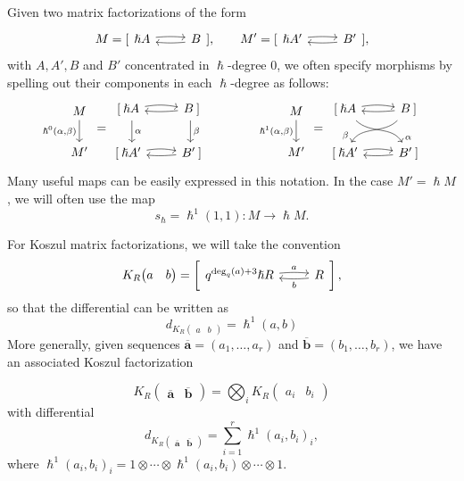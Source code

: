 \documentclass{article}
\newcommand{\mfshort}[4]{%
  \begin{tikzcd}[ampersand replacement=\&]
    {#1} \arrow[r, "#3", bend left=5,start anchor=east, end anchor=west, shift left=2pt]  \& 
    {#2} \arrow[l,"#4", bend left=5, start anchor=west, end anchor=east, shift left=2pt]
  \end{tikzcd}%
}
\newcommand{\kmf}[2]{
	K_{#1}{\begin{pmatrix}
			#2
		\end{pmatrix}
	}	
}
\newcommand{\skmf}[2]{
	K_{#1}{\left(\begin{smallmatrix}
			#2
		\end{smallmatrix}\right)
	}	
}
\theoremstyle{plain} %
\theoremstyle{definition} %
\theoremstyle{remark} %
\begin{document}
Given two matrix factorizations of the form
$$
M=[\mfshort{\hslash  A}{ B}{}{}]
,\qquad 
M'=[\mfshort{\hslash A'}{B'}{}{}]
,
$$
with $A,A',B$ and $B'$ concentrated in $\hslash$-degree 0, we often specify morphisms by spelling out their components in each $\hslash$-degree as follows:
\[
\begin{tikzcd}
    M 
    \arrow[d, "{\hslash^0(\alpha,\beta)}",swap] 
    \\ 
    M'
\end{tikzcd}
=
\begin{tikzcd}
    {} [ \: \hslash A \arrow[d, "\alpha", shift left=3pt]
    \arrow[r, out=5, in=175, bend left=10]  
    &  
     B\:]
    \arrow[d, "\beta", shift right=1pt] 
    \arrow[l, out=185, in=-5, swap]
    \\
   	{}  [\: \hslash A' 
   	\arrow[r, out=5, in=175, bend left=10]
   	& 
    B' \:]
    \arrow[l, out=185, in=-5, swap]
\end{tikzcd}
\qquad\qquad 
\begin{tikzcd}
    M 
    \arrow[d, "{\hslash^1(\alpha,\beta)}",swap] 
    \\ 
    M'
\end{tikzcd}
=
\begin{tikzcd}
    {}  [\:\hslash A \arrow[dr, "\alpha"{pos=1}, out=-45, in=120]\arrow[r, out=5, in=175, bend left=10]  &   B\:]\arrow[dl, "\beta"{pos=1}, out=-135, in=60,swap] \arrow[l, out=185, in=-5, swap]\\
     {} [\:\hslash A' \arrow[r, out=5, in=175, bend left=10]& 
     B' \arrow[l, out=185, in=-5, swap]\:]
\end{tikzcd}
\]
Many useful maps can be easily expressed in this notation. In the case $M'=\hslash M$, we will often use the map
$$
s_\hslash =\hslash^1(1,1):M\to \hslash M
.
$$

For Koszul matrix factorizations, we will take the convention
$$
	\kmf{R}{a & b }
	=
	\left[\mfshort{q^{\deg_q(a)+3} \hslash  R}{R}{a}{b}\right]
	,
$$
so that the differential can be written as
$$
d_{\skmf{R}{a & b }}=\hslash^1 (a,b)
$$
More generally, given sequences $\mathbf{\overline a}=(a_1,\dots,a_r)$ and  $ \mathbf{\overline b}=(b_1,\dots,b_r)$, we have an associated Koszul factorization

$$
	\kmf{R}{\mathbf{\overline a} & \mathbf{\overline b} }
	=
	\bigotimes_i \kmf{R}{a_i & b_i }		
$$
with differential
$$
	d_{\skmf{R}{\mathbf{\overline a} & \mathbf{\overline b} }}
	=
	\sum_{i=1}^r \hslash^1(a_i,b_i)_i
	,
$$
where $\hslash^1(a_i,b_i)_i=1\otimes\cdots\otimes\hslash^1(a_i,b_i)\otimes\cdots\otimes 1$. 
\end{document}
